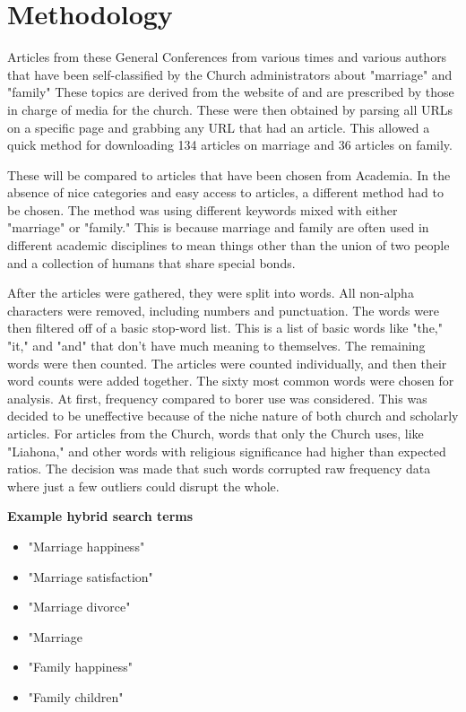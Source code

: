 \documentclass[twocolumn]{article}
\begin{document}
\section{Methodology}
Articles from these General Conferences from various times and various authors that have been self-classified by the Church administrators about "marriage" and "family" These topics are derived from the website of \church and are prescribed by those in charge of media for the church. These were then obtained by parsing all URLs on a specific page and grabbing any URL that had an article. This allowed a quick method for downloading 134 articles on marriage and 36 articles on family.

These will be compared to articles that have been chosen from Academia. In the absence of nice categories and easy access to articles, a different method had to be chosen. The method was using different keywords mixed with either "marriage" or "family." This is because marriage and family are often used in different academic disciplines to mean things other than the union of two people and a collection of humans that share special bonds.

After the articles were gathered, they were split into words. All non-alpha characters were removed, including numbers and punctuation. The words were then filtered off of a basic stop-word list. This is a list of basic words like "the," "it," and "and" that don't have much meaning to themselves. The remaining words were then counted. The articles were counted individually, and then their word counts were added together. The sixty most common words were chosen for analysis. At first, frequency compared to borer use was considered. This was decided to be uneffective because of the niche nature of both church and scholarly articles. For articles from the Church, words that only the Church uses, like "Liahona," and other words with religious significance had higher than expected ratios. The decision was made that such words corrupted raw frequency data where just a few outliers could disrupt the whole.

\begin{center}
    \parbox{\linewidth}{\centering\textbf{Example hybrid search terms}}
\end{center}

\begin{itemize}
    \item "Marriage happiness"
    \item "Marriage satisfaction"
    \item "Marriage divorce"
    \item "Marriage
    \item "Family happiness"
    \item "Family children"
\end{itemize}
\end{document}
